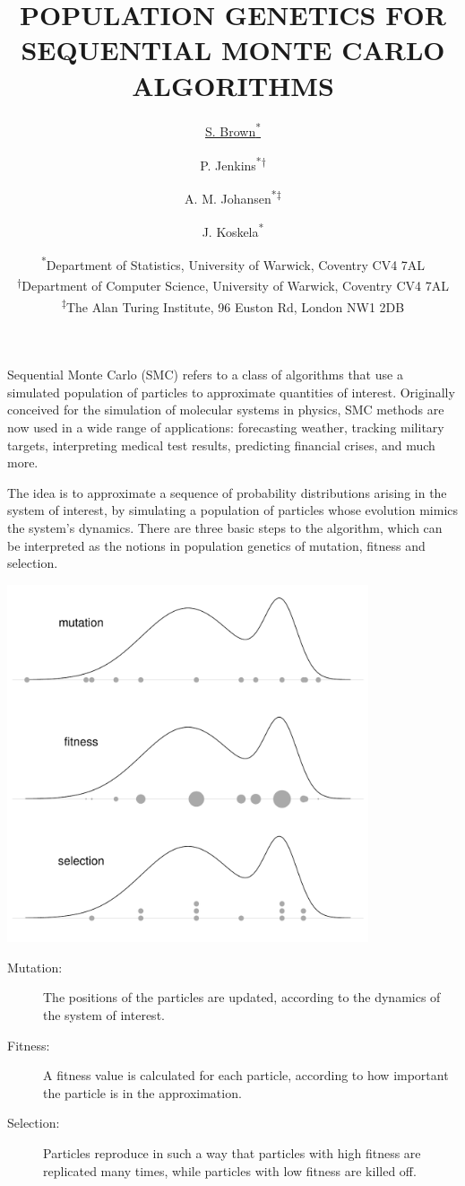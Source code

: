 \documentclass[a4paper]{article}
\title{POPULATION GENETICS FOR SEQUENTIAL MONTE CARLO ALGORITHMS}
\author{\underline{S. Brown\textsuperscript{*}} \and P. Jenkins\textsuperscript{*$\dagger$} \and A. M. Johansen\textsuperscript{*$\ddagger$} \and J. Koskela\textsuperscript{*}}
\date{\small{\textsuperscript{*}Department of Statistics, University of Warwick, Coventry CV4 7AL\\
\textsuperscript{$\dagger$}Department of Computer Science, University of Warwick, Coventry CV4 7AL\\
\textsuperscript{$\ddagger$}The Alan Turing Institute, 96 Euston Rd, London NW1 2DB}}
\begin{document}
\maketitle

Sequential Monte Carlo (SMC) refers to a class of algorithms that use a simulated population of particles to approximate quantities of interest. 
Originally conceived for the simulation of molecular systems in physics, SMC methods are now used in a wide range of applications: forecasting weather, tracking military targets, interpreting medical test results, predicting financial crises, and much more.

The idea is to approximate a sequence of probability distributions arising in the system of interest, by simulating a population of particles whose evolution mimics the system's dynamics. There are three basic steps to the algorithm, which can be interpreted as the notions in population genetics of mutation, fitness and selection.

\vspace{5pt}

\begin{minipage}{0.45\textwidth}
\includegraphics[width=0.8\textwidth]{smc_illustration.pdf}
\end{minipage}
\begin{minipage}{0.45\textwidth}
\begin{description}
\item[Mutation:] The positions of the particles are updated, according to the dynamics of the system of interest.
\item[Fitness:] A fitness value is calculated for each particle, according to how important the particle is in the approximation.
\item[Selection:] Particles reproduce in such a way that particles with high fitness are replicated many times, while particles with low fitness are killed off.
\end{description}
\end{minipage}
\end{document}
